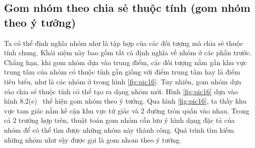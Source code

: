 \subsection{Gom nhóm theo chia sẻ thuộc tính (gom nhóm theo ý tưởng)}
Ta có thể định nghĩa nhóm như là tập hợp của các đối tượng mà chia sẻ thuộc tính chung.
Khái niệm này bao gồm tất cả định nghĩa về nhóm ở các phần trước.
Chẳng hạn, khi gom nhóm dựa vào trung điểm, các đối tượng nằm gần khu vực trung tâm của nhóm có thuộc tính gần giống với điểm trung tâm hay là điểm tiêu biểu, như là các nhóm ở trong hình \ref{fig:pic16}.
Tuy nhiên, gom nhóm dựa vào chia sẻ thuộc tính có thể tạo ra dạng nhóm mới.
Hình \ref{fig:pic16} dựa vào hình 8.2(e)~\cite{Vipin-Kumar} thể hiện gom nhóm theo ý tưởng.
Qua hình \ref{fig:pic16}, ta thấy khu vực tam giác nằm kế cận khu vực tứ giác và 2 đường tròn quấn vào nhau.
Trong cả 2 trường hợp trên, thuật toán gom nhóm cần lưu ý hình dạng đặc tả của nhóm để có thể tìm được những nhóm này thành công.
Quá trình tìm kiếm những nhóm như vậy được gọi là gom nhom theo ý tưởng.

